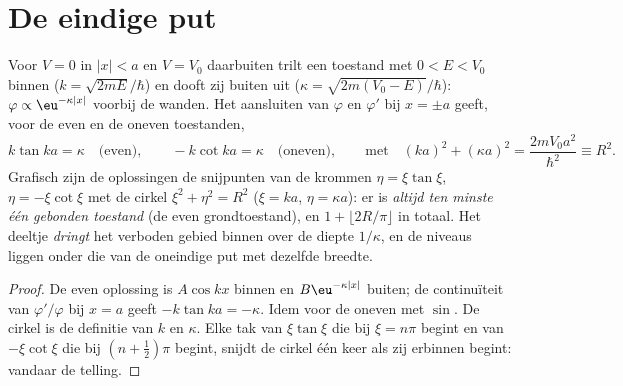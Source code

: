 \section{De eindige put}

\begin{proposition}\label{prop:b2:potential-wells-tunneling:finite}
Voor $V = 0$ in $|x| < a$ en $V = V_0$ daarbuiten trilt een toestand met
$0 < E < V_0$
binnen ($k = \sqrt{2mE}/\hbar$) en dooft zij buiten uit
($\kappa =
\sqrt{2m(V_0 - E)}/\hbar$): $\varphi \propto \eu^{-\kappa|x|}$
voorbij de wanden.
Het aansluiten van $\varphi$ en $\varphi'$ bij $x = \pm a$ geeft, voor de
even en de oneven
toestanden,
\[
k\tan ka = \kappa \quad\text{(even)}, \qquad
-k\cot ka = \kappa \quad\text{(oneven)}, \qquad\text{met}\quad
(ka)^2 + (\kappa a)^2 = \frac{2mV_0a^2}{\hbar^2} \equiv R^2 .
\]
Grafisch zijn de oplossingen de snijpunten van de krommen
$\eta =
\xi\tan\xi$, $\eta = -\xi\cot\xi$ met de cirkel
$\xi^2 + \eta^2 = R^2$
($\xi = ka$, $\eta = \kappa a$): er is \emph{altijd ten minste één gebonden
toestand} (de even grondtoestand), en $1 + \lfloor 2R/\pi\rfloor$ in totaal.
Het deeltje \emph{dringt} het verboden gebied binnen over de diepte
$1/\kappa$, en de niveaus liggen onder die van de oneindige put met
dezelfde breedte.
\end{proposition}

\begin{proof}
De even oplossing is $A\cos kx$ binnen en $B\eu^{-\kappa|x|}$ buiten; de
continuïteit van $\varphi'/\varphi$ bij $x = a$ geeft $-k\tan ka = -\kappa$. Idem
voor de oneven met $\sin$. De cirkel is de definitie van $k$ en
$\kappa$. Elke tak van $\xi\tan\xi$ die bij $\xi = n\pi$ begint en van
$-\xi\cot\xi$ die bij $(n + \tfrac12)\pi$ begint, snijdt de cirkel één keer als zij
erbinnen begint: vandaar de telling.
\end{proof}


